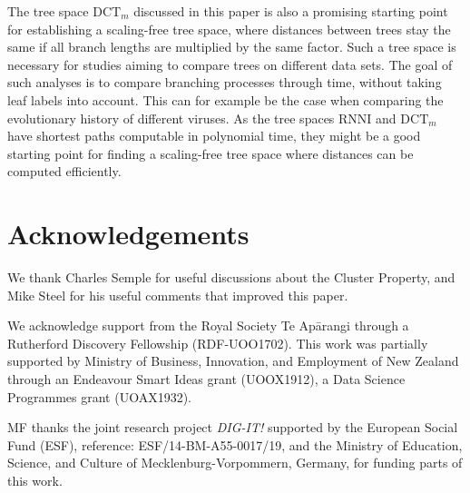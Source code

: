\documentclass[11pt]{amsart}
\newcommand{\rnni}{\mathrm{RNNI}}
\newcommand{\dtt}{\mathrm{DCT}}
\newcommand{\summary}[1]{} %
\begin{document}
\summary{scaling-free tree space}
The tree space $\dtt_m$ discussed in this paper is also a promising starting point for establishing a scaling-free tree space, where distances between trees stay the same if all branch lengths are multiplied by the same factor.
Such a tree space is necessary for studies aiming to compare trees on different data sets.
The goal of such analyses is to compare branching processes through time, without taking leaf labels into account.
This can for example be the case when comparing the evolutionary history of different viruses.
As the tree spaces $\rnni$ and $\dtt_m$ have shortest paths computable in polynomial time, they might be a good starting point for finding a scaling-free tree space where distances can be computed efficiently.

\section*{Acknowledgements}
We thank Charles Semple for useful discussions about the Cluster Property, and Mike Steel for his useful comments that improved this paper.

We acknowledge support from the Royal Society Te Ap\=arangi through a Rutherford Discovery Fellowship (RDF-UOO1702).
This work was partially supported by Ministry of Business, Innovation, and Employment of New Zealand through an Endeavour Smart Ideas grant (UOOX1912), a Data Science Programmes grant (UOAX1932).

MF thanks the joint research project \textit{DIG-IT!} supported by the European Social Fund (ESF), reference: ESF/14-BM-A55-0017/19, and the Ministry of Education, Science, and Culture of Mecklenburg-Vorpommern, Germany, for funding parts of this work.


\printbibliography
\end{document}
